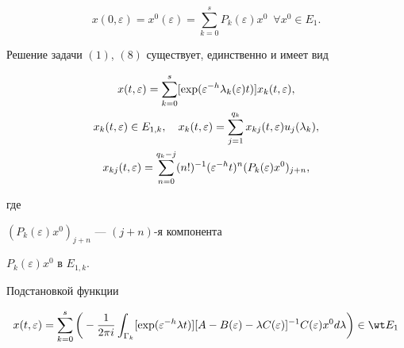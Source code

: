 \begin{equation}


x(0,\varepsilon)=x^0(\varepsilon)=\sum_{k=0}^sP_k(\varepsilon)x^0


\ \; \forall x^0\in E_1.


\end{equation}





\begin{thm}


Решение задачи $(1)$, $(8)$ существует, единственно и имеет вид


\begin{gather}


x(t,\varepsilon)=\sum_{k=0}^s[\exp(\varepsilon^{-h}\lambda_k(\varepsilon)t)]


x_k(t,\varepsilon),\notag \\


%


x_k(t,\varepsilon)\in E_{1,k}, \quad


x_k(t,\varepsilon)=\sum_{j=1}^{q_k}x_{kj}(t,\varepsilon)


u_j(\lambda_k),\notag \\


%


x_{kj}(t,\varepsilon)=\sum_{n=0}^{q_k-j}(n!)^{-1}(\varepsilon


^{-h}t)^n(P_k(\varepsilon)x^0)_{j+n},


\end{gather}


где


$(P_k(\varepsilon)x^0)_{j+n}$ --- $(j+n)$-я компонента


$P_k(\varepsilon)x^0$ в $E_{1,k}$.


\end{thm}





Подстановкой функции


\begin{equation}


x(t,\varepsilon)=\sum_{k=0}^s\bigg(-\frac{1}{2\pi


i}\int_{\Gamma_k}[\exp(\varepsilon^{-h} \lambda


t)][A-B(\varepsilon)-\lambda


C(\varepsilon)]^{-1}C(\varepsilon)x^0d\lambda\bigg)\in\wt E_1


\end{equation}


